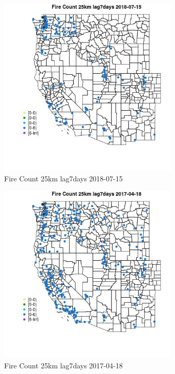\begin{figure} 
\centering  
\includegraphics[width=0.77\textwidth]{Code_Outputs/Report_ML_input_PM25_Step4_part_e_de_duplicated_aves_compiled_2019-05-20wNAs_MapObsFire_Count_25km_lag7days2018-07-15.jpg} 
\caption{\label{fig:Report_ML_input_PM25_Step4_part_e_de_duplicated_aves_compiled_2019-05-20wNAsMapObsFire_Count_25km_lag7days2018-07-15}Fire Count 25km lag7days 2018-07-15} 
\end{figure} 
 

\clearpage 

\begin{figure} 
\centering  
\includegraphics[width=0.77\textwidth]{Code_Outputs/Report_ML_input_PM25_Step4_part_e_de_duplicated_aves_compiled_2019-05-20wNAs_MapObsFire_Count_25km_lag7days2017-04-18.jpg} 
\caption{\label{fig:Report_ML_input_PM25_Step4_part_e_de_duplicated_aves_compiled_2019-05-20wNAsMapObsFire_Count_25km_lag7days2017-04-18}Fire Count 25km lag7days 2017-04-18} 
\end{figure} 
 

